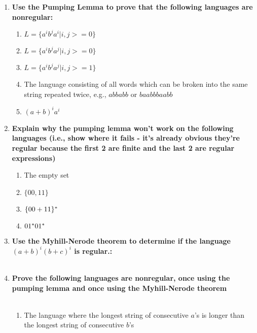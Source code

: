 

\begin{enumerate}

\item \textbf{Use the Pumping Lemma to prove that the following languages are nonregular:}

\begin{enumerate}
	\item $L = \{a^ib^j a^i | i , j >=0\}$
	
	\item $L = \{a^ib^ja^j | i , j >=0\}$ 
	
	\item $L = \{a^ib^ja^j | i , j >=1\}$
	
	
	\item The language consisting of all words which can be broken into the same string repeated twice, e.g., $abbabb$ or $baabbbaabb$
	
	\item $(a+b)^ia^i$
\end{enumerate}

\newpage
\item \textbf{Explain why the pumping lemma won't work on the following languages (i.e., show where it fails - it's already obvious they're regular because the first 2 are finite and the last 2 are regular expressions)}

\begin{enumerate}
	\item The empty set
	
	\item $\{00,11\}$
	
	\item $\{00+11\}{}^\ast$
	
	\item $01{}^\ast 01 {}^\ast$
\end{enumerate}


\newpage
\item \textbf{Use the Myhill-Nerode theorem to determine if the language $(a+b)^i (b+c)^i$ is regular.:}
\\\\

\newpage
\item \textbf{Prove the following languages are nonregular, once using the pumping lemma and once using the Myhill-Nerode theorem}
\\\\
\begin{enumerate}
	\item The language where the longest string of consecutive $a$'s is longer than the longest string of consecutive $b$'s
	

\end{enumerate}
\end{enumerate}
